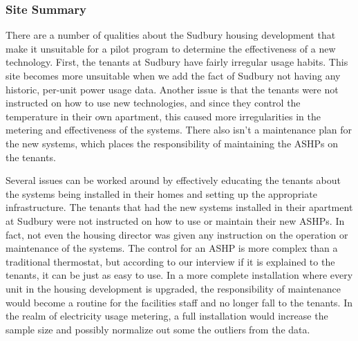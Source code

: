 \subsubsection{Site Summary}
\par There are a number of qualities about the Sudbury housing development that make it unsuitable for a pilot program to determine the effectiveness of a new technology. First, the tenants at Sudbury have fairly irregular usage habits. This site becomes more unsuitable when we add the fact of Sudbury not having any historic, per-unit power usage data. Another issue is that the tenants were not instructed on how to use new technologies, and since they control the temperature in their own apartment, this caused more irregularities in the metering and effectiveness of the systems. There also isn’t a maintenance plan for the new systems, which places the responsibility of maintaining the ASHPs on the tenants.
\par Several issues can be worked around by effectively educating the tenants about the systems being installed in their homes and setting up the appropriate infrastructure. The tenants that had the new systems installed in their apartment at Sudbury were not instructed on how to use or maintain their new ASHPs. In fact, not even the housing director was given any instruction on the operation or maintenance of the systems. The control for an ASHP is more complex than a traditional thermostat, but according to our interview if it is explained to the tenants, it can be just as easy to use. In a more complete installation where every unit in the housing development is upgraded, the responsibility of maintenance would become a routine for the facilities staff and no longer fall to the tenants. In the realm of electricity usage metering, a full installation would increase the sample size and possibly normalize out some the outliers from the data. 


